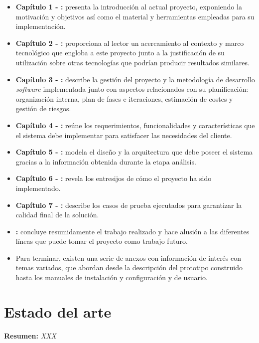 \documentclass[12pt,a4paper, twoside]{report}
\begin{document}
	\begin{itemize}
		\item \textbf{Capítulo 1 - :} presenta la introducción al actual proyecto, exponiendo la motivación y objetivos así como el material y herramientas empleadas para su implementación.		
		\item \textbf{Capítulo 2 - :} proporciona al lector un acercamiento al contexto y marco tecnológico que engloba a este proyecto junto a la justificación de su utilización sobre otras tecnologías que podrían producir resultados similares.		
		\item \textbf{Capítulo 3 - :} describe la gestión del proyecto y la metodología de desarrollo \textit{software} implementada junto con aspectos relacionados con su planificación: organización interna, plan de fases e iteraciones, estimación de costes y gestión de riesgos.		
		\item \textbf{Capítulo 4 - :} reúne los requerimientos, funcionalidades y características que el sistema debe implementar para satisfacer las necesidades del cliente.
		\item \textbf{Capítulo 5 - :} modela el diseño y la arquitectura que debe poseer el sistema gracias a la información obtenida durante la etapa análisis. 
		\item \textbf{Capítulo 6 - :} revela los entresijos de cómo el proyecto ha sido implementado.
		\item \textbf{Capítulo 7 - :} describe los casos de prueba ejecutados para garantizar la calidad final de la solución.
		\item \textbf{:} concluye resumidamente el trabajo realizado y hace alusión a las diferentes líneas que puede tomar el proyecto como trabajo futuro.	 
		\item Para terminar, existen una serie de anexos con información de interés con temas variados, que abordan desde la descripción del \gls{prototipo} construido hasta los manuales de instalación y configuración y de usuario.
	\end{itemize}
	
	\chapter{Estado del arte} \label{stateArtChapter}
	\textbf{Resumen:} \textit{XXX}
	
\end{document}
